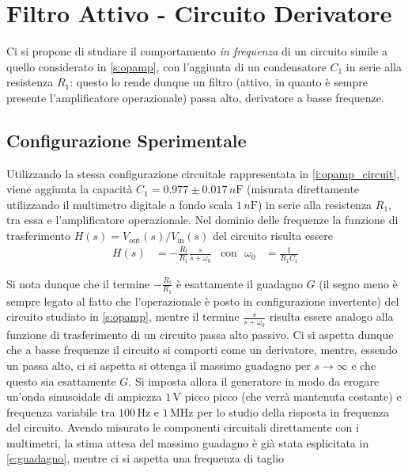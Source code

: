 \documentclass[a4paper,11pt]{article} %
\begin{document}

\section{Filtro Attivo - Circuito Derivatore}
Ci si propone di studiare il comportamento \textit{in frequenza} di un circuito simile a quello
considerato in \autoref{s:opamp}, con l'aggiunta di un condensatore $C_{1}$ in serie alla resistenza $R_{1}$: questo lo
rende dunque un filtro (attivo, in quanto è sempre presente l'amplificatore operazionale) passa alto, derivatore a basse
frequenze. 


\subsection{Configurazione Sperimentale}
Utilizzando la stessa configurazione circuitale rappresentata in \autoref{i:opamp_circuit}, viene aggiunta la capacità
$C_{1} = 0.977 \pm 0.017 \,\si{n\farad}$ (misurata direttamente utilizzando il multimetro digitale a fondo scala
$1\,\si{n\farad}$) in serie alla resistenza $R_{1}$, tra essa e l'amplificatore operazionale. Nel dominio delle
frequenze la funzione di trasferimento $H(s)=V_{\text{out}}(s)/V_{\text{in}}(s)$ del circuito risulta essere 
\begin{align}
	H(s) &= -\frac{R_{\text{f}}}{R_{1}}\frac{s}{s+\omega_{0}} & \text{con}\,\,\,\, \omega_{0}&=\frac{1}{R_{1}C_{1}}
\end{align}

\noindent Si nota dunque che il termine $-\frac{R_{\text{f}}}{R_{1}}$ è esattamente il guadagno $G$ (il segno meno è
sempre legato al fatto che l'operazionale è posto in configurazione invertente) del circuito studiato in
\autoref{s:opamp}, mentre il termine $\frac{s}{s+\omega_{0}}$ risulta essere analogo alla funzione di trasferimento di
un circuito passa alto passivo. Ci si aspetta dunque che a basse frequenze il circuito si comporti come un derivatore,
mentre, essendo un passa alto, ci si aspetta si ottenga il massimo guadagno per $s\rightarrow\infty$ e che questo sia
esattamente $G$. Si imposta allora il generatore in modo da erogare un'onda sinusoidale di ampiezza $1\,\si{\volt}$
picco picco (che verrà mantenuta costante) e frequenza variabile tra $100\,\si{\Hz}$ e $1\,\si{\MHz}$ per lo studio
della risposta in frequenza del circuito. Avendo misurato le componenti circuitali direttamente con i multimetri, la
stima attesa del massimo guadagno è già stata esplicitata in \autoref{e:guadagno}, mentre ci si aspetta una frequenza di
taglio
\end{document}
